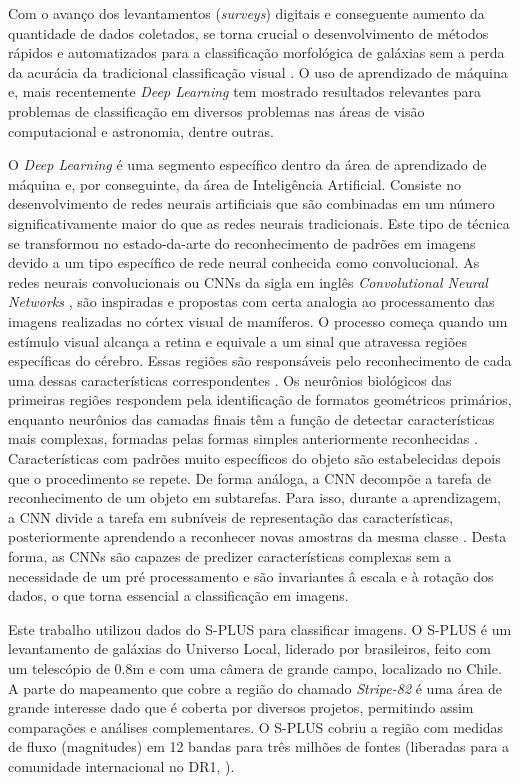 Com o avanço dos levantamentos (\emph{surveys}) digitais e conseguente aumento da quantidade de dados coletados, se torna crucial o desenvolvimento de métodos rápidos e automatizados para a classificação morfológica de galáxias sem a perda da acurácia da tradicional classificação visual \cite{yamauchi2005}. O uso de aprendizado de máquina e, mais recentemente \emph{Deep Learning} tem mostrado resultados relevantes para problemas de classificação em diversos problemas nas áreas de visão computacional e astronomia, dentre outras.

O \emph{Deep Learning} \cite{Goodfellow2016} é uma segmento específico dentro da área de aprendizado de máquina e, por conseguinte, da área de Inteligência Artificial. Consiste no desenvolvimento de redes neurais artificiais que são combinadas em um número significativamente maior do que as redes neurais tradicionais. Este tipo de técnica se transformou no estado-da-arte do reconhecimento de padrões em imagens devido a um tipo específico de rede neural conhecida como convolucional.
As redes neurais convolucionais ou CNNs da sigla em inglês \textit{Convolutional Neural Networks} \cite{lecun2015deep}, são inspiradas e propostas com certa analogia ao processamento das imagens realizadas no córtex visual de mamíferos. O processo começa quando um estímulo visual alcança a retina e equivale a um sinal que atravessa regiões específicas do cérebro. Essas regiões são responsáveis pelo reconhecimento de cada uma dessas características correspondentes \cite{karpathy2016convolutional}.
Os neurônios biológicos das primeiras regiões respondem pela identificação de formatos geométricos primários, enquanto neurônios das camadas finais têm a função de detectar características mais complexas, formadas pelas formas simples anteriormente reconhecidas \cite{karpathy2016convolutional,vedaldi2015matconvnet}. Características com padrões muito específicos do objeto são estabelecidas depois que o procedimento se repete.
De forma análoga, a CNN decompõe a tarefa de reconhecimento de um objeto em subtarefas. Para isso, durante a aprendizagem, a CNN divide a tarefa em subníveis de representação das características, posteriormente aprendendo a reconhecer novas amostras da mesma classe  \cite{lecun2015deep,vedaldi2015matconvnet}.
Desta forma, as CNNs são capazes de predizer características complexas sem a necessidade de um pré processamento e são invariantes â escala e à rotação dos dados, o que torna essencial a classificação em imagens.

Este trabalho utilizou dados do S-PLUS para classificar imagens. O S-PLUS \cite{oliveira2019} é um levantamento de galáxias do Universo Local, liderado por brasileiros, feito com um telescópio de 0.8m e com uma câmera de grande campo, localizado no Chile. A parte do mapeamento que cobre a região do chamado \emph{Stripe-82} é uma área de grande interesse dado que é coberta por diversos projetos, permitindo assim comparações e análises complementares. O S-PLUS cobriu a região com medidas de fluxo (magnitudes) em 12 bandas para três milhões de fontes (liberadas para a comunidade internacional no DR1, \cite{oliveira2019}).